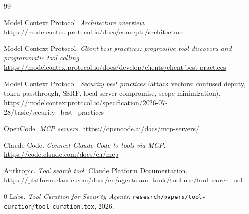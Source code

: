 \documentclass[11pt]{article}
\begin{document}
\begin{thebibliography}{99}

Model Context Protocol. \textit{Architecture overview}.
\url{https://modelcontextprotocol.io/docs/concepts/architecture}

Model Context Protocol. \textit{Client best practices: progressive tool
discovery and programmatic tool calling}.
\url{https://modelcontextprotocol.io/docs/develop/clients/client-best-practices}

Model Context Protocol. \textit{Security best practices} (attack vectors:
confused deputy, token passthrough, SSRF, local server compromise, scope
minimization).
\url{https://modelcontextprotocol.io/specification/2026-07-28/basic/security_best_practices}

OpenCode. \textit{MCP servers}.
\url{https://opencode.ai/docs/mcp-servers/}

Claude Code. \textit{Connect Claude Code to tools via MCP}.
\url{https://code.claude.com/docs/en/mcp}

Anthropic. \textit{Tool search tool}. Claude Platform Documentation.
\url{https://platform.claude.com/docs/en/agents-and-tools/tool-use/tool-search-tool}

0 Labs. \textit{Tool Curation for Security Agents}.
\texttt{research/papers/tool-curation/tool-curation.tex}, 2026.

\end{thebibliography}
\end{document}
